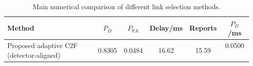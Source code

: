 \begin{table}[t]
    \centering
    \caption{Main numerical comparison of different link selection methods.}
    \label{tab:main_summary}
    \begin{tabular}{l c c c c c}
        \hline
        Method & $P_D$ & $P_{\mathrm{FA}}$ & Delay/ms & Reports & $P_D$/ms \\
        \hline
        Proposed adaptive C2F (detector-aligned) & 0.8305 & 0.0484 & 16.62 & 15.59 & 0.0500 \
        \hline
    \end{tabular}
\end{table}
